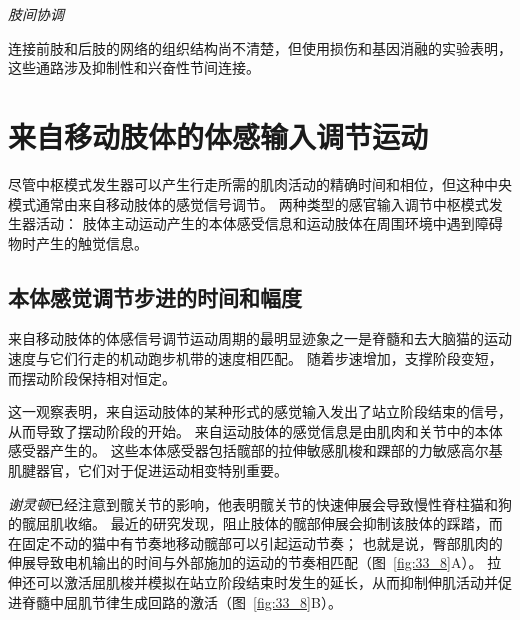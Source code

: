 \textit{肢间协调}

连接前肢和后肢的网络的组织结构尚不清楚，但使用损伤和基因消融的实验表明，这些通路涉及抑制性和兴奋性节间连接。



\section{来自移动肢体的体感输入调节运动}

尽管中枢模式发生器可以产生行走所需的肌肉活动的精确时间和相位，但这种中央模式通常由来自移动肢体的感觉信号调节。
两种类型的感官输入调节中枢模式发生器活动：
肢体主动运动产生的本体感受信息和运动肢体在周围环境中遇到障碍物时产生的触觉信息。



\subsection{本体感觉调节步进的时间和幅度}

来自移动肢体的体感信号调节运动周期的最明显迹象之一是脊髓和去大脑猫的运动速度与它们行走的机动跑步机带的速度相匹配。
随着步速增加，支撑阶段变短，而摆动阶段保持相对恒定。


这一观察表明，来自运动肢体的某种形式的感觉输入发出了站立阶段结束的信号，从而导致了摆动阶段的开始。
来自运动肢体的感觉信息是由肌肉和关节中的本体感受器产生的。
这些本体感受器包括髋部的拉伸敏感肌梭和踝部的力敏感高尔基肌腱器官，它们对于促进运动相变特别重要。


\textit{谢灵顿}已经注意到髋关节的影响，他表明髋关节的快速伸展会导致慢性脊柱猫和狗的髋屈肌收缩。
最近的研究发现，阻止肢体的髋部伸展会抑制该肢体的踩踏，而在固定不动的猫中有节奏地移动髋部可以引起运动节奏；
也就是说，臀部肌肉的伸展导致电机输出的时间与外部施加的运动的节奏相匹配（图~\ref{fig:33_8}A）。
拉伸还可以激活屈肌梭并模拟在站立阶段结束时发生的延长，从而抑制伸肌活动并促进脊髓中屈肌节律生成回路的激活（图~\ref{fig:33_8}B）。


